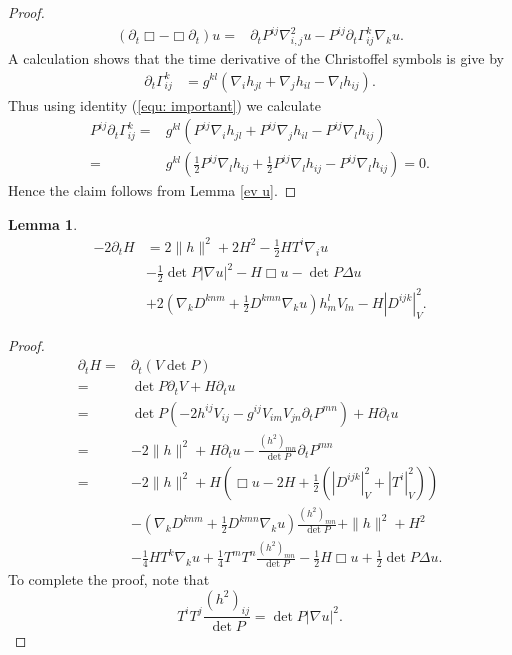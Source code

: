 \documentclass{amsart}
\newtheorem{lemma}[theorem]{Lemma}
\theoremstyle{definition}
\theoremstyle{remark}
\numberwithin{equation}{section}
\begin{document}
\begin{proof}
\begin{align*}
(\partial_t \Box-\Box \partial_t)u
=&\partial_tP^{ij}\nabla^2_{i,j}u-P^{ij}\partial_t\Gamma_{ij}^k\nabla_ku.
\end{align*}
A calculation shows that the time derivative of the Christoffel symbols is give by
\begin{align*}
\partial_t \Gamma_{ij}^k&=g^{kl}\left(\nabla_ih_{jl}+\nabla_jh_{il}-\nabla_{l}h_{ij}\right).
\end{align*}
Thus using identity (\ref{equ: important}) we calculate
\begin{align*}
P^{ij}\partial_t \Gamma_{ij}^k=&g^{kl}\left(P^{ij}\nabla_ih_{jl}+P^{ij}\nabla_jh_{il}-P^{ij}\nabla_{l}h_{ij}\right)\\
=&g^{kl}\left(\frac{1}{2}P^{ij}\nabla_lh_{ij}+\frac{1}{2}P^{ij}\nabla_lh_{ij}-P^{ij}\nabla_{l}h_{ij}\right)=0.
\end{align*}
Hence the claim follows from Lemma \ref{ev u}.
\end{proof}
\begin{lemma}
\begin{align*}
-2\partial_tH&=2\|h\|^2+2H^2-\frac{1}{2}HT^i\nabla_iu
\\&-\frac{1}{2}\det P |\nabla u|^2
-H\Box u-\det P\Delta u\\
&+2\left(\nabla_kD^{knm}+\frac{1}{2}D^{kmn}\nabla_ku\right)h_m^lV_{ln}
-H\left|D^{ijk}\right|_V^2.
\end{align*}
\end{lemma}
\begin{proof}
\begin{align*}
\partial_tH=&\partial_t(V\det P)\\
=&\det P\partial_t V+H\partial_tu\\
=&\det P(-2h^{ij}V_{ij}-g^{ij}V_{im}V_{jn}\partial_tP^{mn})+H\partial_tu\\
=&-2\|h\|^2+H\partial_tu-\frac{(h^2)_{mn}}{\det P}\partial_tP^{mn}\\
=&-2\|h\|^2+H\left(\Box u-2H+\frac{1}{2}\left(\left|D^{ijk}\right|^2_V+\left|T^i\right|_V^2\right)\right)\\
&-\left(\nabla_kD^{knm}+\frac{1}{2}D^{kmn}\nabla_ku\right)\frac{(h^2)_{mn}}{\det P}+\|h\|^2+H^2\\
&-\frac{1}{4}HT^k\nabla_ku+\frac{1}{4}T^mT^n\frac{(h^2)_{mn}}{\det P}-\frac{1}{2}H\Box u+\frac{1}{2}\det P\Delta u.
\end{align*}
To complete the proof, note that
\[T^iT^j\frac{(h^2)_{ij}}{\det P}=\det P|\nabla u|^2.\]
\end{proof}
\end{document}
